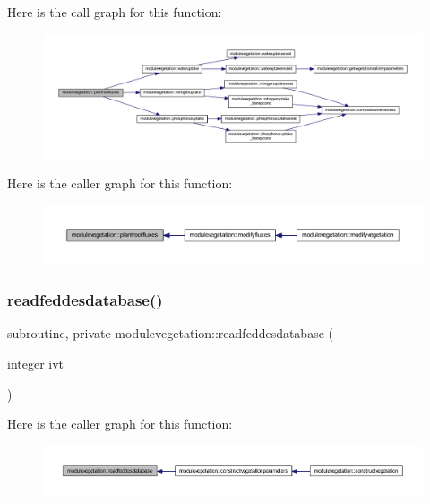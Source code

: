 Here is the call graph for this function\+:\nopagebreak
\begin{figure}[H]
\begin{center}
\leavevmode
\includegraphics[width=350pt]{namespacemodulevegetation_abcc76339f35e9a70675847ad459a843c_cgraph}
\end{center}
\end{figure}
Here is the caller graph for this function\+:\nopagebreak
\begin{figure}[H]
\begin{center}
\leavevmode
\includegraphics[width=350pt]{namespacemodulevegetation_abcc76339f35e9a70675847ad459a843c_icgraph}
\end{center}
\end{figure}
\mbox{\label{namespacemodulevegetation_a561695c331526aacf6d2359ccf064e5b}} 
\subsubsection{\texorpdfstring{readfeddesdatabase()}{readfeddesdatabase()}}
{\footnotesize\ttfamily subroutine, private modulevegetation\+::readfeddesdatabase (\begin{DoxyParamCaption}\item[{integer}]{ivt }\end{DoxyParamCaption})\hspace{0.3cm}{\ttfamily [private]}}

Here is the caller graph for this function\+:\nopagebreak
\begin{figure}[H]
\begin{center}
\leavevmode
\includegraphics[width=350pt]{namespacemodulevegetation_a561695c331526aacf6d2359ccf064e5b_icgraph}
\end{center}
\end{figure}
\mbox{\label{namespacemodulevegetation_a5f1703a3712f12ee155098c63f043191}} 
